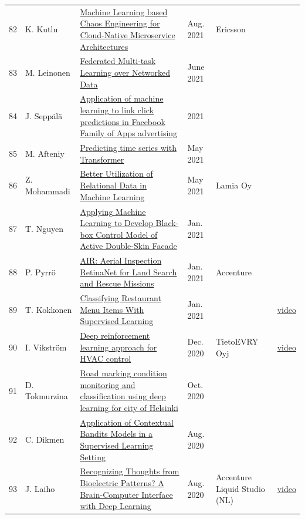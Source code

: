 \documentclass[11pt,a4paper]{article}
\begin{document}
\begin{longtable}{@{}r p{2.8cm} p{6.3cm} p{1.6cm} p{2cm} p{1.8cm}@{}}
82 & K. Kutlu & \href{https://aaltodoc.aalto.fi/handle/123456789/109355}{Machine Learning based Chaos Engineering for Cloud-Native Microservice Architectures} & Aug. 2021 & Ericsson &  \\
83 & M. Leinonen & \href{https://aaltodoc.aalto.fi/handle/123456789/108261}{Federated Multi-task Learning over Networked Data} & June 2021 &  &  \\
84 & J. Seppälä & \href{https://aaltodoc.aalto.fi/handle/123456789/106829}{Application of machine learning to link click predictions in Facebook Family of Apps advertising} & 2021 &  &  \\
85 & M. Afteniy & \href{https://aaltodoc.aalto.fi/handle/123456789/107662}{Predicting time series with Transformer} & May 2021 &  &  \\
86 & Z. Mohammadi & \href{https://aaltodoc.aalto.fi/handle/123456789/107604}{Better Utilization of Relational Data in Machine Learning} & May 2021 & Lamia Oy &  \\
87 & T. Nguyen & \href{https://aaltodoc.aalto.fi/handle/123456789/102547}{Applying Machine Learning to Develop Black-box Control Model of Active Double-Skin Facade} & Jan. 2021 &  &  \\
88 & P. Pyrrö & \href{https://aaltodoc.aalto.fi/handle/123456789/112856}{AIR: Aerial Inspection RetinaNet for Land Search and Rescue Missions} & Jan. 2021 & Accenture &  \\
89 & T. Kokkonen & \href{https://aaltodoc.aalto.fi/handle/123456789/102433}{Classifying Restaurant Menu Items With Supervised Learning} & Jan. 2021 &  & \href{https://youtu.be/TaYlv6MFoeU}{video} \\
90 & I. Vikström & \href{https://aaltodoc.aalto.fi/handle/123456789/97613}{Deep reinforcement learning approach for HVAC control} & Dec. 2020 & TietoEVRY Oyj & \href{https://youtu.be/OSL8CkWd-as}{video} \\
91 & D. Tokmurzina & \href{https://aaltodoc.aalto.fi/handle/123456789/47388}{Road marking condition monitoring and classification using deep learning for city of Helsinki} & Oct. 2020 &  &  \\
92 & C. Dikmen & \href{https://aaltodoc.aalto.fi/handle/123456789/46314}{Application of Contextual Bandits Models in a Supervised Learning Setting} & Aug. 2020 &  &  \\
93 & J. Laiho & \href{https://aaltodoc.aalto.fi/handle/123456789/46105}{Recognizing Thoughts from Bioelectric Patterns? A Brain-Computer Interface with Deep Learning} & Aug. 2020 & Accenture Liquid Studio (NL) & \href{https://youtu.be/IouXWsJsm0Q}{video} \\

\end{longtable}
\end{document}
